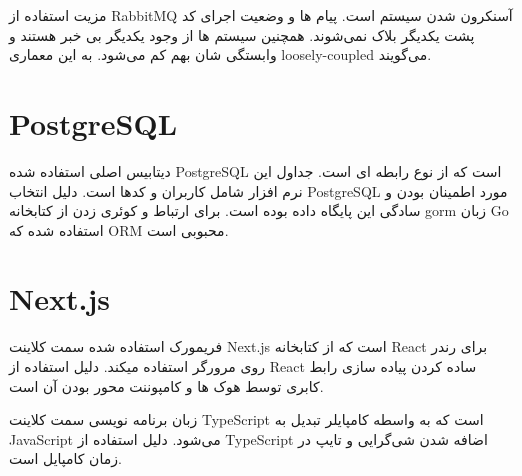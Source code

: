 مزیت استفاده از RabbitMQ آسنکرون شدن سیستم است. پیام ها و وضعیت اجرای کد پشت یکدیگر بلاک نمی‌شوند.
همچنین سیستم ها از وجود یکدیگر بی خبر هستند و وابستگی شان بهم کم می‌شود. به این معماری loosely-coupled می‌گویند.

\section{PostgreSQL}
دیتابیس اصلی استفاده شده PostgreSQL است که از نوع رابطه ای است.
جداول این نرم افزار شامل کاربران و کدها است.
دلیل انتخاب PostgreSQL مورد اطمینان بودن و سادگی این پایگاه داده بوده است.
برای ارتباط و کوئری زدن از کتابخانه gorm زبان Go استفاده شده که ORM محبوبی  است.

\section{Next.js}
فریمورک استفاده شده سمت کلاینت Next.js است که از کتابخانه React برای رندر روی مرورگر استفاده میکند.
دلیل استفاده از React ساده کردن پیاده سازی رابط کابری توسط هوک ها و کامپوننت محور بودن آن است.

زبان برنامه نویسی سمت کلاینت TypeScript است که به واسطه کامپایلر تبدیل به JavaScript می‌شود.
دلیل استفاده از TypeScript اضافه شدن شی‌گرایی و تایپ در زمان کامپایل است.
